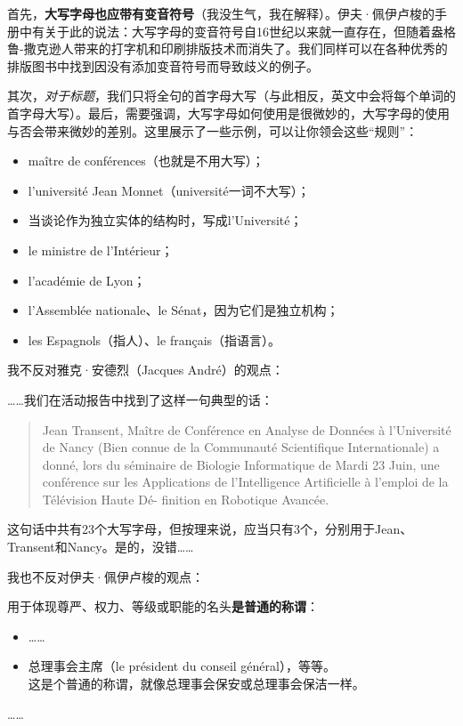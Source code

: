 首先，\textbf{大写字母也应带有变音符号}（我没生气，我在解释）。伊夫·佩伊卢梭的手册中有关于此的说法：大写字母的变音符号自16世纪以来就一直存在，但随着盎格鲁-撒克逊人带来的打字机和印刷排版技术而消失了。我们同样可以在各种优秀的排版图书中找到因没有添加变音符号而导致歧义的例子。

其次，\emph{对于标题}，我们只将全句的首字母大写（与此相反，英文中会将每个单词的首字母大写）。最后，需要强调，大写字母如何使用是很微妙的，大写字母的使用与否会带来微妙的差别。这里展示了一些示例，可以让你领会这些``规则''：

\begin{itemize}
    \item maître de conférences（也就是不用大写）；
    \item l'université Jean Monnet（université一词不大写）；
    \item 当谈论作为独立实体的结构时，写成l'Université；
    \item le ministre de l'Intérieur；
    \item l'académie de Lyon；
    \item l'Assemblée nationale、le Sénat，因为它们是独立机构；
    \item les Espagnols（指人）、le français（指语言）。
\end{itemize}

我不反对雅克·安德烈（Jacques André）的观点：

\begin{origincitation}[雅克·安德烈{[2]}]
    ……我们在活动报告中找到了这样一句典型的话：
    
    \begin{quote}
        Jean Transent, Maître de Conférence en Analyse de Données à l'Université de Nancy (Bien connue de la Communauté Scientifique Internationale) a donné, lors du séminaire de Biologie Informatique de Mardi 23 Juin, une conférence sur les Applications de l'Intelligence Artificielle à l'emploi de la Télévision Haute Dé- finition en Robotique Avancée.
    \end{quote}

    这句话中共有23个大写字母，但按理来说，应当只有3个，分别用于Jean、Transent和Nancy。是的，没错……
\end{origincitation}

我也不反对伊夫·佩伊卢梭的观点：

\begin{origincitation}[伊夫·佩伊卢梭{[13]}]
    用于体现尊严、权力、等级或职能的名头\textbf{是普通的称谓}：
    \begin{itemize}
        \item ……
        \item 总理事会主席（le président du conseil général），等等。\\\textsf{这是个普通的称谓，就像总理事会保安或总理事会保洁一样。}%
    \end{itemize}%

    ……
\end{origincitation}

